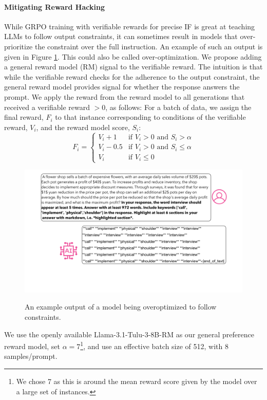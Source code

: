 \documentclass{article}
\begin{document}
\paragraph{Mitigating Reward Hacking}
While GRPO training with verifiable rewards for precise IF is great at teaching LLMs to follow output constraints, it can sometimes result in models that over-prioritize the constraint over the full instruction. An example of such an output is given in Figure \ref{fig:hacking}.
This could also be called over-optimization.
We propose adding a general reward model (RM) signal to the verifiable reward. 
The intuition is that while the verifiable reward checks for the adherence to the output constraint, the general reward model provides signal for whether the response answers the prompt. 
We apply the reward from the reward model to all generations that received a verifiable reward $>0$, as follows: For a batch of data, we assign the final reward, $F_i$ to that instance corresponding to conditions of the verifiable reward, $V_i$, and the reward model score, $S_i$:
\begin{equation}
    F_i = \begin{cases}
    V_i + 1 & \text{if } V_i > 0 \text{ and } S_i > \alpha \\
    V_i - 0.5 & \text{if } V_i > 0 \text{ and } S_i \le \alpha \\
    V_i & \text{if } V_i \le 0
\end{cases}
\end{equation}


\begin{figure}[t]
    \centering
    \includegraphics[width=0.7\linewidth]{figures/overoptimization.pdf}
    \label{fig:hacking}
        \caption{An example output of a model being overoptimized to follow constraints.}
\end{figure}


We use the openly available Llama-3.1-Tulu-3-8B-RM as our general preference reward model, set $\alpha = 7$\footnote{We chose 7 as this is around the mean reward score given by the model over a large set of instances.}, and use an effective batch size of 512, with 8 samples/prompt.
\end{document}
